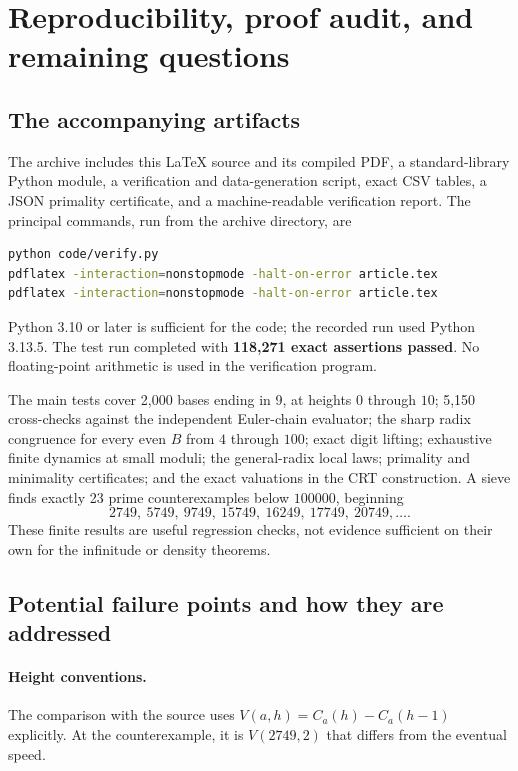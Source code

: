\documentclass[11pt,letterpaper]{article}
\numberwithin{equation}{section}
\theoremstyle{definition}
\theoremstyle{remark}
\begin{document}
\section{Reproducibility, proof audit, and remaining questions}\label{sec:repro}

\subsection{The accompanying artifacts}

The archive includes this \LaTeX{} source and its compiled PDF, a standard-library Python module, a verification and data-generation script, exact CSV tables, a JSON primality certificate, and a machine-readable verification report. The principal commands, run from the archive directory, are
\begin{lstlisting}[language=bash]
python code/verify.py
pdflatex -interaction=nonstopmode -halt-on-error article.tex
pdflatex -interaction=nonstopmode -halt-on-error article.tex
\end{lstlisting}
Python 3.10 or later is sufficient for the code; the recorded run used Python 3.13.5. The test run completed with \textbf{118,271 exact assertions passed}. No floating-point arithmetic is used in the verification program.

The main tests cover 2,000 bases ending in 9, at heights $0$ through $10$; 5,150 cross-checks against the independent Euler-chain evaluator; the sharp radix congruence for every even $B$ from $4$ through $100$; exact digit lifting; exhaustive finite dynamics at small moduli; the general-radix local laws; primality and minimality certificates; and the exact valuations in the CRT construction. A sieve finds exactly 23 prime counterexamples below $100000$, beginning
\[
 2749,\ 5749,\ 9749,\ 15749,\ 16249,\ 17749,\ 20749,\ldots.
\]
These finite results are useful regression checks, not evidence sufficient on their own for the infinitude or density theorems.

\subsection{Potential failure points and how they are addressed}

\paragraph{Height conventions.}
The comparison with the source uses $V(a,h)=C_a(h)-C_a(h-1)$ explicitly. At the counterexample, it is $V(2749,2)$ that differs from the eventual speed.
\end{document}
